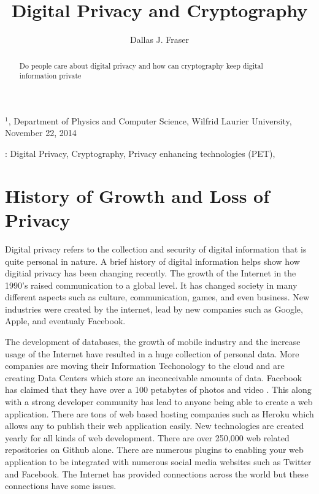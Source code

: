 \documentclass[12pt]{article}
\title{Digital Privacy and Cryptography}
\author{
	Dallas J. Fraser\inst{1}
}
\def\inst#1{$^{#1}$}
\begin{document}
\maketitle

\begin{center}
{\footnotesize

\inst{1}, Department of Physics and Computer Science, Wilfrid Laurier 
University, November 22, 2014}

\end{center}

\begin{abstract}
Do people care about digital privacy and how can cryptography keep digital information private
\end{abstract}

: Digital Privacy, Cryptography, Privacy enhancing technologies (PET),

\clearpage

\section{History of Growth and Loss of Privacy}\label{sec:history}

Digital privacy refers to the collection and security of digital information that is quite personal in nature. A brief history of digital information helps show how digitial privacy has been changing recently. The growth of the Internet in the 1990's raised communication to a global level. It has changed society in many different aspects such as culture, communication, games, and even business. New industries were created by the internet, lead by new companies such as Google, Apple, and eventualy Facebook.

The development of databases, the growth of mobile industry  and the increase usage of the Internet have resulted in a huge collection of personal data. More companies are moving their Information Techonology to the cloud and are creating Data Centers which store an inconceivable amounts of data. Facebook has claimed that they have over a 100 petabytes of photos and video \cite{Wallbank}. This along with a strong developer community has lead to anyone being able to create a web application. There are tons of web based hosting companies such as Heroku which allows any to publish their web application easily. New technologies are created yearly for all kinds of web development. There are over 250,000 web related repositories on Github alone. There are numerous plugins to enabling your web application to be integrated with numerous social media websites such as Twitter and Facebook. The Internet has provided connections across the world but these connections have some issues.
\end{document}
